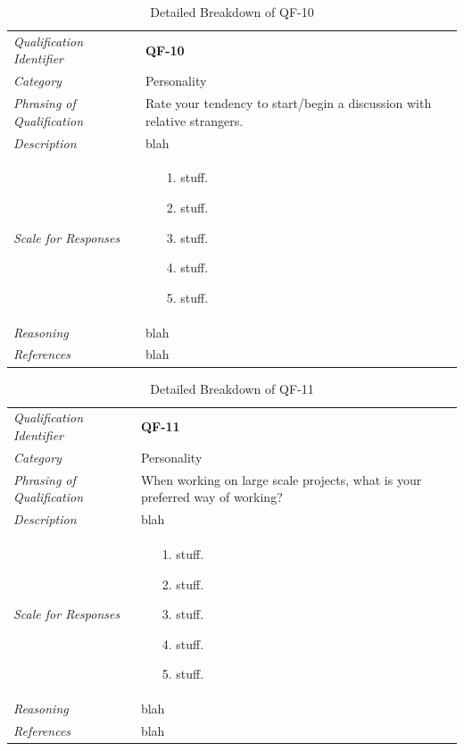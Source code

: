 \documentclass[12pt,letterpaper]{article}
\begin{document}
\begin{table}[H]
	\caption{Detailed Breakdown of QF-10}
	\begin{tabu} to 
		\toprule
		Qualification Identifier & {\bf QF-10}\\
		Category & Personality \\
		Phrasing of Qualification & Rate your tendency to start/begin a discussion with relative strangers. \\
		Description & blah\\
		Scale for Responses &
		\begin{minipage}[t]{\linewidth}
			\begin{enumerate}
				\item[1.] stuff.
				\item[2.] stuff.
				\item[3.] stuff.
				\item[4.] stuff.
				\item[5.] stuff.
			\end{enumerate}
		\end{minipage}\\
		Reasoning & blah\\
		References & blah\\
		\toprule
	\end{tabu}
\end{table}

\begin{table}[H]
	\caption{Detailed Breakdown of QF-11}
	\begin{tabu} to 
		\toprule
		Qualification Identifier & {\bf QF-11}\\
		Category & Personality \\
		Phrasing of Qualification & When working on large scale projects, what is your preferred way of working? \\
		Description & blah\\
		Scale for Responses &
		\begin{minipage}[t]{\linewidth}
			\begin{enumerate}
				\item[1.] stuff.
				\item[2.] stuff.
				\item[3.] stuff.
				\item[4.] stuff.
				\item[5.] stuff.
			\end{enumerate}
		\end{minipage}\\
		Reasoning & blah\\
		References & blah\\
		\toprule
	\end{tabu}
\end{table}
\end{document}
